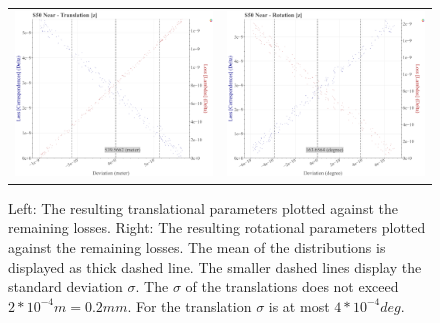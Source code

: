 \begin{figure}[!ht]
\begin{tabular}{cc}
    \includegraphics[width=0.45 \linewidth]{diagrams/calibration/s50_s_near/parameters.csv/Translation[z]_vs_Loss[Correspondences]_vs_Loss[Lambdas]_cluster_All.png} &
    \includegraphics[width=0.45 \linewidth]{diagrams/calibration/s50_s_near/parameters.csv/Rotation[z]_vs_Loss[Correspondences]_vs_Loss[Lambdas]_cluster_All.png} \\
\end{tabular}
\caption{
  Left: The resulting translational parameters plotted against the remaining losses. 
  Right: The resulting rotational parameters plotted against the remaining losses.
  The mean of the distributions is displayed as thick dashed line. The smaller dashed lines display the standard deviation $\sigma$.
  The $\sigma$ of the translations does not exceed $2 * 10^{-4} m = 0.2 mm$.
  For the translation $\sigma$ is at most $4 * 10^{-4} deg$.
  }
\label{fig:static_calibration_algorithmic_error_s50_s_near}
\end{figure}
